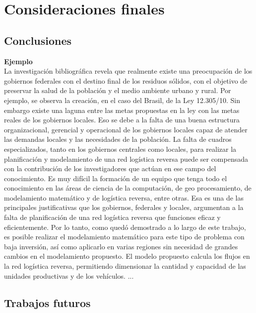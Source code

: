 \chapter{Consideraciones finales}
\setcounter{page}{24}
\renewcommand{\baselinestretch}{2} %


\section{Conclusiones}

{\bf Ejemplo}\\
La investigación bibliográfica revela que realmente existe una preocupación de los gobiernos federales con el destino final de los residuos sólidos, con el objetivo de preservar la salud de la población y el medio ambiente urbano y rural. Por ejemplo, se observa la creación, en el caso del Brasil, de la Ley 12.305/10. Sin embargo existe una laguna entre las metas propuestas en la ley con las metas reales de los gobiernos locales. Eso se debe a la falta de una buena estructura organizacional, gerencial y operacional de los gobiernos locales capaz de atender las demandas locales y las necesidades de la población.
\vskip 0.3cm
La falta de cuadros especializados, tanto en los gobiernos centrales como locales, para realizar la planificación y modelamiento de una red logística reversa puede ser compensada con la contribución de los investigadores que actúan en ese campo del conocimiento. Es muy difícil la formación de un equipo que tenga todo el conocimiento en las áreas de ciencia de la computación, de geo procesamiento, de modelamiento matemático y de logística reversa, entre otras. Esa es una de las principales justificativas que los gobiernos, federales y locales, argumentan a la falta de planificación de una red logística reversa que funciones eficaz y eficientemente. 
\vskip 0.3cm
Por lo tanto, como quedó demostrado a lo largo de este trabajo, es posible realizar el modelamiento matemático para este tipo de problema con baja inversión, así como aplicarlo en varias regiones sin necesidad de grandes cambios en el modelamiento propuesto. El modelo propuesto calcula los flujos en la red logística reversa, permitiendo dimensionar la cantidad y capacidad de las unidades productivas y de los vehículos. 
\vskip 0.3cm
...


\section{Trabajos futuros}

